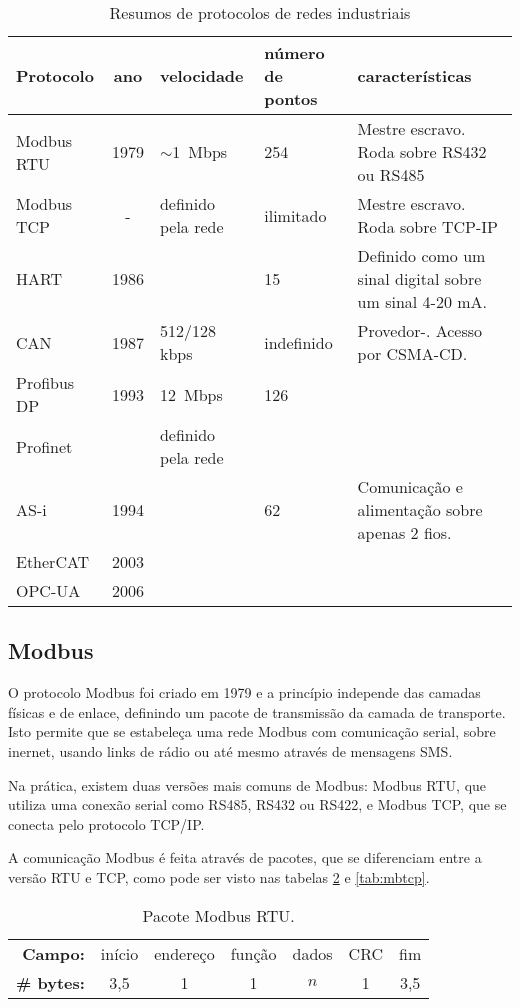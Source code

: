 \begin{table}[h]
    \caption{Resumos de protocolos de redes industriais}\label{tab:protocolos}
    \begin{tabular}{l|cp{20mm}p{20mm}p{35mm}}
        \hline
        Protocolo & ano & velocidade & número de pontos & características\\
        \hline
        Modbus RTU & 1979 & $\sim$1~Mbps & 254 & Mestre escravo. Roda sobre RS432 ou RS485\\
        Modbus TCP & - & definido pela rede & ilimitado & Mestre escravo. Roda sobre TCP-IP\\
        HART & 1986 & & 15 & Definido como um sinal digital sobre um sinal 4-20 mA.\\
        CAN & 1987 & 512/128 kbps & indefinido & Provedor-. Acesso por CSMA-CD.\\
        Profibus DP & 1993 & 12~Mbps & 126 & \\
        Profinet &  & definido pela rede &  & \\
        AS-i & 1994 & & 62 & Comunicação e alimentação sobre apenas 2 fios.\\
        EtherCAT & 2003 & & & \\
        OPC-UA & 2006 & & & \\
        \hline
    \end{tabular}
\end{table}

\subsection{Modbus}

O protocolo Modbus foi criado em 1979 e a princípio independe das camadas físicas e de enlace, definindo um pacote de transmissão da camada de transporte. Isto permite que se estabeleça uma rede Modbus com comunicação serial, sobre inernet, usando links de rádio ou até mesmo através de mensagens SMS.

Na prática, existem duas versões mais comuns de Modbus: Modbus RTU, que utiliza uma conexão serial como RS485, RS432 ou RS422, e Modbus TCP, que se conecta pelo protocolo TCP/IP.

A comunicação Modbus é feita através de pacotes, que se diferenciam entre a versão RTU e TCP, como pode ser visto nas tabelas \ref{tab:mbrtu} e \ref{tab:mbtcp}.

\begin{table}
    \centering
    \caption{Pacote Modbus RTU.}\label{tab:mbrtu}
    \begin{tabular}{r|c|c|c|c|c|c|}
        \cline{2-7}
        \textbf{Campo:} & início & endereço & função & dados & CRC & fim\\
        \cline{2-7}
        \textbf{\# bytes:} & 3,5 & 1 & 1 & $n$ & 1 & 3,5 \\
        \cline{2-7}
    \end{tabular}
\end{table}

